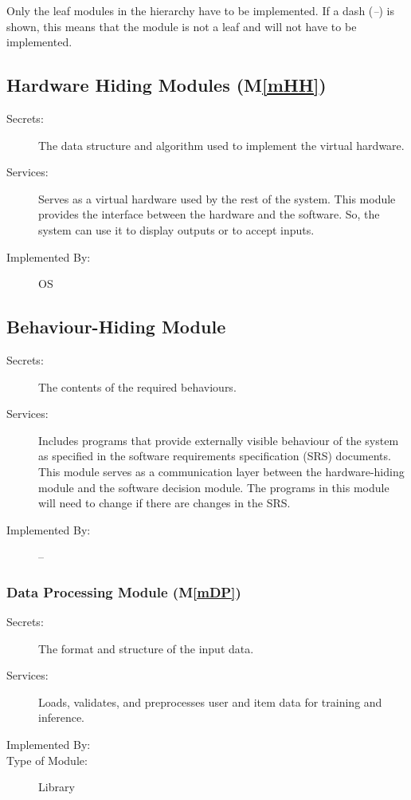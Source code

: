 \documentclass[12pt, titlepage]{article}
\newcommand{\mref}[1]{M\ref{#1}}
\begin{document}
Only the leaf modules in the hierarchy have to be implemented. If a dash
(\emph{--}) is shown, this means that the module is not a leaf and will not have
to be implemented.

\subsection{Hardware Hiding Modules (\mref{mHH})}

\begin{description}
\item[Secrets:]The data structure and algorithm used to implement the virtual
  hardware.
\item[Services:]Serves as a virtual hardware used by the rest of the
  system. This module provides the interface between the hardware and the
  software. So, the system can use it to display outputs or to accept inputs.
\item[Implemented By:] OS
\end{description}

\subsection{Behaviour-Hiding Module}

\begin{description}
\item[Secrets:]The contents of the required behaviours.
\item[Services:]Includes programs that provide externally visible behaviour of
  the system as specified in the software requirements specification (SRS)
  documents. This module serves as a communication layer between the
  hardware-hiding module and the software decision module. The programs in this
  module will need to change if there are changes in the SRS.
\item[Implemented By:] --
\end{description}

\subsubsection{Data Processing Module (\mref{mDP})}

\begin{description}
\item[Secrets:]The format and structure of the input data.
\item[Services:]Loads, validates, and preprocesses user and item data for training and inference.
\item[Implemented By:] \progname
\item[Type of Module:] Library
\end{description}
\end{document}
